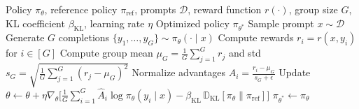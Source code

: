 \documentclass[12pt,a4paper]{report}
\theoremstyle{definition}
\newcommand{\source}[1]{\vspace{-0.5\baselineskip}\caption*{\small Source: #1}}
\begin{document}
\begin{algorithm}[htbp]
\caption{Group Relative Policy Optimization (GRPO) algorithm. Unlike PPO, GRPO normalizes advantages within each group of completions, \textbf{eliminating the need for a separate value/critic network}. A reward signal $r(\cdot)$ is still required---this can be verifiable/programmatic or from a learned reward model.}
\label{alg:grpo}
\small
\begin{algorithmic}[1]
\Require Policy $\pi_\theta$, reference policy $\pi_{\text{ref}}$, prompts $\mathcal{D}$, reward function $r(\cdot)$, group size $G$, KL coefficient $\beta_{\text{KL}}$, learning rate $\eta$
\Ensure Optimized policy $\pi_{\theta^*}$
    \State Sample prompt $x \sim \mathcal{D}$
    \State Generate $G$ completions $\{y_1, \ldots, y_G\} \sim \pi_\theta(\cdot \mid x)$
    \State Compute rewards $r_i = r(x, y_i)$ for $i \in [G]$
    \State Compute group mean $\mu_G = \frac{1}{G}\sum_{j=1}^{G} r_j$ and std $s_G = \sqrt{\frac{1}{G}\sum_{j=1}^{G}(r_j - \mu_G)^2}$
    \State Normalize advantages $\hat{A}_i = \frac{r_i - \mu_G}{s_G + \epsilon}$ 
    \State Update $\theta \leftarrow \theta + \eta \nabla_\theta \Big[\frac{1}{G}\sum_{i=1}^{G} \hat{A}_i \log \pi_\theta(y_i \mid x) - \beta_{\text{KL}}\, \mathbb{D}_{\text{KL}}[\pi_\theta \| \pi_{\text{ref}}]\Big]$ 
\EndFor
\State \Return $\pi_{\theta^*} \gets \pi_\theta$
\end{algorithmic}
\source{Simplified single-update form adapted from DeepSeek-Math~\cite{shao2024deepseekmath} and DeepSeek-R1~\cite{deepseek2025r1}; the PPO-style ratio and clipping used with multiple updates per batch are omitted.}
\end{algorithm}
\end{document}
